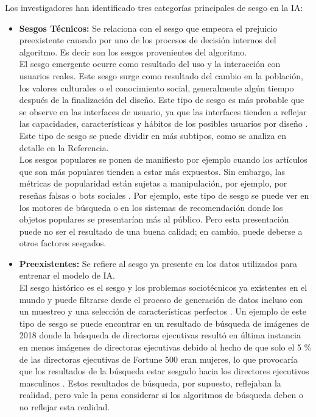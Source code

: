 \documentclass[runningheads,a4paper]{llncs}
\begin{document}
Los investigadores han identificado tres categor\'ias principales de sesgo en la IA:\\
\begin{itemize}

\item {\bf Sesgos T\'ecnicos: } Se relaciona con el sesgo que empeora el prejuicio preexistente causado por uno de los procesos de decisi\'on internos del algoritmo. Es decir son los sesgos provenientes del algoritmo.\\

 El sesgo emergente ocurre como resultado del uso y la interacci\'on con usuarios reales. Este sesgo surge 
como resultado del cambio en la poblaci\'on, los valores culturales o el conocimiento social, generalmente alg\'un tiempo 
despu\'es de la finalizaci\'on del diseño. Este tipo de sesgo es m\'as probable que se observe en las interfaces de usuario, 
ya que las interfaces tienden a reflejar las capacidades, caracter\'isticas y h\'abitos de los posibles usuarios por diseño . 
Este tipo de sesgo se puede dividir en m\'as subtipos, como se analiza en detalle en la Referencia.\cite{Bat}\\

Los sesgos populares se ponen de manifiesto por ejemplo cuando los art\'iculos que son m\'as populares tienden a estar m\'as expuestos.
 Sin embargo, las m\'etricas de popularidad est\'an sujetas a manipulaci\'on, por ejemplo, por rese\~nas falsas o bots sociales . Por ejemplo,
  este tipo de sesgo se puede ver en los motores de b\'usqueda  o en los sistemas de recomendaci\'on 
donde los objetos populares se presentar\'ian más al p\'ublico. Pero esta presentaci\'on puede no ser el resultado de una buena 
calidad; en cambio, puede deberse a otros factores sesgados.\\\cite{Aza}

\item {\bf Preexistentes:} Se refiere al sesgo ya presente en los datos utilizados para entrenar el modelo de IA.\\

El sesgo hist\'orico es el sesgo y los problemas sociot\'ecnicos ya existentes en el mundo y puede filtrarse 
desde el proceso de generaci\'on de datos incluso con un muestreo y una selecci\'on de caracter\'isticas perfectos \cite{Ha}. Un 
ejemplo de este tipo de sesgo se puede encontrar en un resultado de b\'usqueda de im\'agenes de 2018 donde la b\'usqueda 
de directoras ejecutivas result\'o en \'ultima instancia en menos im\'agenes de directoras ejecutivas debido al hecho de que 
solo el 5 \%  de las directoras ejecutivas de Fortune 500 eran mujeres, lo que provocar\'ia que los resultados de la b\'usqueda 
estar sesgado hacia los directores ejecutivos masculinos \cite{Ha}. Estos resultados de b\'usqueda, por supuesto, reflejaban la 
realidad, pero vale la pena considerar si los algoritmos de b\'usqueda deben o no reflejar esta realidad.\\


\end{itemize}
\end{document}
